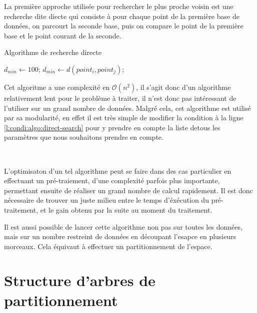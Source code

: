 La première approche utilisée pour rechercher le plus proche voisin est une recherche dite diecte qui consiste à pour chaque point de la première base de données, on parcourt la seconde base, puis on compare le point de la première base et le point courant de la seconde.

	\begin{algorithm}
		\caption{Algorithme de recherche directe}
		\label{algo:direct-search}
		\begin{algorithmic}[1]
			\State $d_{min} \gets 100$; 
					  \label{l:condi:algo:direct-search}
						\State $d_{min} \gets d(point_i , point_j)$;
					\EndIf
				\EndFor
			\EndFor
		\end{algorithmic}
	\end{algorithm}

Cet algoritme a une complexité en $\mathcal{O}(n^{2})$, il s'agit donc d'un algorithme relativement lent pour le problème à traiter, il n'est donc pas intéressant de l'utiliser sur un grand nombre de données. Malgré cela, cet algorithme est utilisé par sa modularité, en effet il est très simple de modifier la condition à la ligne \ref{l:condi:algo:direct-search} pour y prendre en compte la liste detous les paramètres que nous souhaitons prendre en compte.

\

L'optimisaton d'un tel algorithme peut se faire dans des cas particulier en effectuant un pré-traiement, d'une complexité parfois plus importante, permettant ensuite de réaliser un grand nombre de calcul rapidement. Il est donc nécessaire de trouver un juste milieu entre le temps d'éxécution du pré-traitement, et le gain obtenu par la suite au moment du traitement.

Il est aussi possible de lancer cette algorithme non pas sur toutes les données, mais sur un nombre restreint de données en découpant l'esapce en plusieurs morceaux. Cela équivaut à effectuer un partitionnement de l'espace.


\section[Arbres de partitionnement]{Structure d'arbres de partitionnement}

